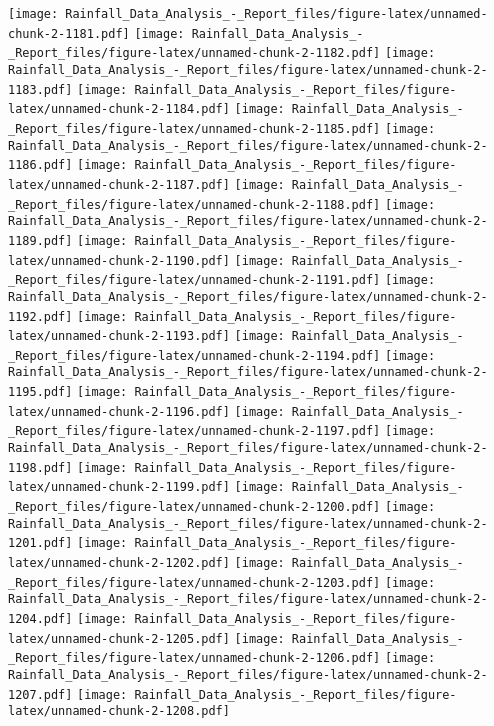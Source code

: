 \documentclass[
]{article}
\begin{document}
\texttt{[image: Rainfall\_Data\_Analysis\_-\_Report\_files/figure-latex/unnamed-chunk-2-1181.pdf]}
\texttt{[image: Rainfall\_Data\_Analysis\_-\_Report\_files/figure-latex/unnamed-chunk-2-1182.pdf]}
\texttt{[image: Rainfall\_Data\_Analysis\_-\_Report\_files/figure-latex/unnamed-chunk-2-1183.pdf]}
\texttt{[image: Rainfall\_Data\_Analysis\_-\_Report\_files/figure-latex/unnamed-chunk-2-1184.pdf]}
\texttt{[image: Rainfall\_Data\_Analysis\_-\_Report\_files/figure-latex/unnamed-chunk-2-1185.pdf]}
\texttt{[image: Rainfall\_Data\_Analysis\_-\_Report\_files/figure-latex/unnamed-chunk-2-1186.pdf]}
\texttt{[image: Rainfall\_Data\_Analysis\_-\_Report\_files/figure-latex/unnamed-chunk-2-1187.pdf]}
\texttt{[image: Rainfall\_Data\_Analysis\_-\_Report\_files/figure-latex/unnamed-chunk-2-1188.pdf]}
\texttt{[image: Rainfall\_Data\_Analysis\_-\_Report\_files/figure-latex/unnamed-chunk-2-1189.pdf]}
\texttt{[image: Rainfall\_Data\_Analysis\_-\_Report\_files/figure-latex/unnamed-chunk-2-1190.pdf]}
\texttt{[image: Rainfall\_Data\_Analysis\_-\_Report\_files/figure-latex/unnamed-chunk-2-1191.pdf]}
\texttt{[image: Rainfall\_Data\_Analysis\_-\_Report\_files/figure-latex/unnamed-chunk-2-1192.pdf]}
\texttt{[image: Rainfall\_Data\_Analysis\_-\_Report\_files/figure-latex/unnamed-chunk-2-1193.pdf]}
\texttt{[image: Rainfall\_Data\_Analysis\_-\_Report\_files/figure-latex/unnamed-chunk-2-1194.pdf]}
\texttt{[image: Rainfall\_Data\_Analysis\_-\_Report\_files/figure-latex/unnamed-chunk-2-1195.pdf]}
\texttt{[image: Rainfall\_Data\_Analysis\_-\_Report\_files/figure-latex/unnamed-chunk-2-1196.pdf]}
\texttt{[image: Rainfall\_Data\_Analysis\_-\_Report\_files/figure-latex/unnamed-chunk-2-1197.pdf]}
\texttt{[image: Rainfall\_Data\_Analysis\_-\_Report\_files/figure-latex/unnamed-chunk-2-1198.pdf]}
\texttt{[image: Rainfall\_Data\_Analysis\_-\_Report\_files/figure-latex/unnamed-chunk-2-1199.pdf]}
\texttt{[image: Rainfall\_Data\_Analysis\_-\_Report\_files/figure-latex/unnamed-chunk-2-1200.pdf]}
\texttt{[image: Rainfall\_Data\_Analysis\_-\_Report\_files/figure-latex/unnamed-chunk-2-1201.pdf]}
\texttt{[image: Rainfall\_Data\_Analysis\_-\_Report\_files/figure-latex/unnamed-chunk-2-1202.pdf]}
\texttt{[image: Rainfall\_Data\_Analysis\_-\_Report\_files/figure-latex/unnamed-chunk-2-1203.pdf]}
\texttt{[image: Rainfall\_Data\_Analysis\_-\_Report\_files/figure-latex/unnamed-chunk-2-1204.pdf]}
\texttt{[image: Rainfall\_Data\_Analysis\_-\_Report\_files/figure-latex/unnamed-chunk-2-1205.pdf]}
\texttt{[image: Rainfall\_Data\_Analysis\_-\_Report\_files/figure-latex/unnamed-chunk-2-1206.pdf]}
\texttt{[image: Rainfall\_Data\_Analysis\_-\_Report\_files/figure-latex/unnamed-chunk-2-1207.pdf]}
\texttt{[image: Rainfall\_Data\_Analysis\_-\_Report\_files/figure-latex/unnamed-chunk-2-1208.pdf]}
\end{document}
